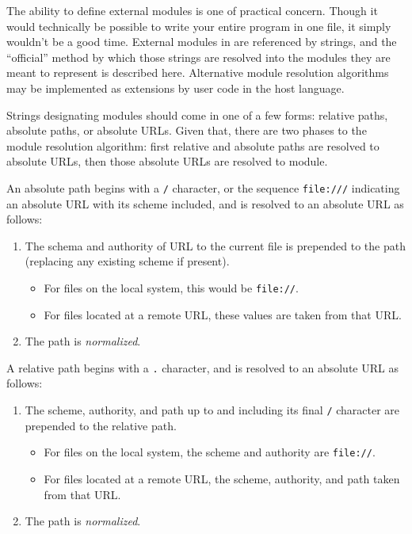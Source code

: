 The ability to define external modules is one of practical concern. Though it
would technically be possible to write your entire program in one file,
it simply wouldn't be a good time. External modules in \Trilogy{} are
referenced by strings, and the ``official'' method by which those strings
are resolved into the modules they are meant to represent is described here.
Alternative module resolution algorithms may be implemented as extensions by
user code in the host language.

Strings designating modules should come in one of a few forms: relative paths,
absolute paths, or absolute URLs. Given that, there are two phases to the module
resolution algorithm: first relative and absolute paths are resolved to absolute
URLs, then those absolute URLs are resolved to module.

An absolute path begins with a \texttt{/} character, or the sequence \texttt{file:///}
indicating an absolute URL with its scheme included, and is resolved to an absolute
URL as follows:

\begin{enumerate}
    \item The schema and authority of URL to the current \Trilogy{} file is prepended
    to the path (replacing any existing scheme if present).
    \begin{itemize}
        \item For files on the local system, this would be \texttt{file://}.
        \item For files located at a remote URL, these values are taken from that URL.
    \end{itemize}
    \item The path is \emph{normalized}.
\end{enumerate}

\noindent
A relative path begins with a \texttt{.} character, and is resolved to an absolute
URL as follows:

\begin{enumerate}
    \item The scheme, authority, and path up to and including its final \texttt{/} character
    are prepended to the relative path.
    \begin{itemize}
        \item For files on the local system, the scheme and authority are \texttt{file://}.
        \item For files located at a remote URL, the scheme, authority, and path taken
        from that URL.
    \end{itemize}
    \item The path is \emph{normalized}.
\end{enumerate}

